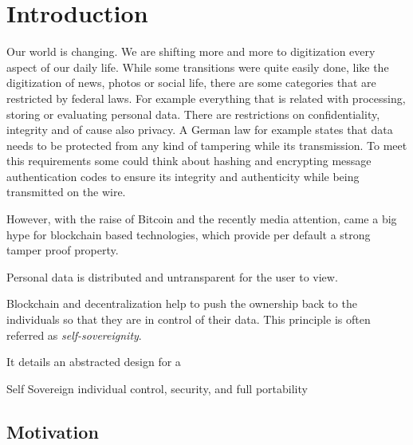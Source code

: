 \chapter{Introduction}
\label{cha:introduction}

Our world is changing. We are shifting more and more to digitization every aspect of our daily life.
While some transitions were quite easily done, like the digitization of news, photos or social life,
there are some categories that are restricted by federal laws. For example everything that is related with processing,
storing or evaluating personal data. There are restrictions on confidentiality, integrity and of cause also privacy.
A German law for example states that data needs to be protected from any kind of tampering while its transmission.
To meet this requirements some could think about hashing and encrypting message authentication codes to ensure its
integrity and authenticity while being transmitted on the wire.

However, with the raise of Bitcoin and the recently media attention, came a big hype for blockchain based technologies,
which provide per default a strong tamper proof property.

Personal data is distributed and untransparent for the user to view.\cite[p. 1]{uPortWhitePaper}

Blockchain and decentralization help to push the ownership back to the individuals so that they are in control of their
data. This principle is often referred as \textit{self-sovereignity}.\cite[p. 1]{uPortWhitePaper}

It details an abstracted design for a

Self Sovereign individual control, security, and full portability

\section{Motivation}

